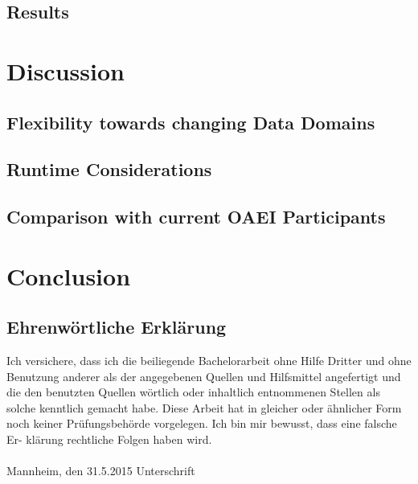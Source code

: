 \documentclass[11pt,titlepage,oneside,openany,a4paper]{report}
\begin{document}
\section{Results}



\chapter{Discussion}
\section{Flexibility towards changing Data Domains}
\section{Runtime Considerations}
\section{Comparison with current OAEI Participants}


\chapter{Conclusion}


\clearpage
\newpage







\newpage

\pagestyle{empty}


\section*{Ehrenw\"ortliche Erkl\"arung}
Ich versichere, dass ich die beiliegende Bachelorarbeit ohne Hilfe Dritter
und ohne Benutzung anderer als der angegebenen Quellen und Hilfsmittel
angefertigt und die den benutzten Quellen w\"ortlich oder inhaltlich
entnommenen Stellen als solche kenntlich gemacht habe. Diese Arbeit
hat in gleicher oder \"ahnlicher Form noch keiner Pr\"ufungsbeh\"orde
vorgelegen. Ich bin mir bewusst, dass eine falsche Er- kl\"arung rechtliche Folgen haben
wird.
\\
\\

\noindent
Mannheim, den 31.5.2015 \hspace{4cm} Unterschrift
\end{document}
